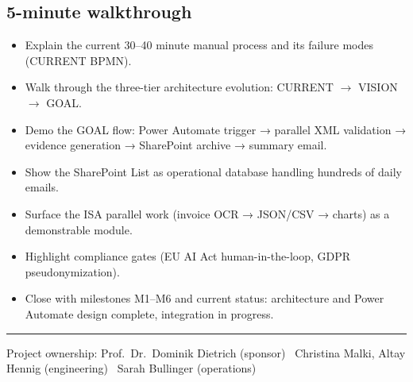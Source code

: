 \documentclass[11pt,a4paper]{article}
\begin{document}
\subsection*{5-minute walkthrough}
\begin{itemize}[leftmargin=*, nosep]
  \item Explain the current 30--40 minute manual process and its failure modes (CURRENT BPMN).
  \item Walk through the three-tier architecture evolution: CURRENT $\rightarrow$ VISION $\rightarrow$ GOAL.
  \item Demo the GOAL flow: Power Automate trigger → parallel XML validation → evidence generation → SharePoint archive → summary email.
  \item Show the SharePoint List as operational database handling hundreds of daily emails.
  \item Surface the ISA parallel work (invoice OCR → JSON/CSV → charts) as a demonstrable module.
  \item Highlight compliance gates (EU AI Act human-in-the-loop, GDPR pseudonymization).
  \item Close with milestones M1--M6 and current status: architecture and Power Automate design complete, integration in progress.
\end{itemize}

\vfill
\hrule
\small\color{ISAAIMuted}
Project ownership: Prof.\ Dr.\ Dominik Dietrich (sponsor) \textbar\
Christina Malki, Altay Hennig (engineering) \textbar\
Sarah Bullinger (operations)
\end{document}
